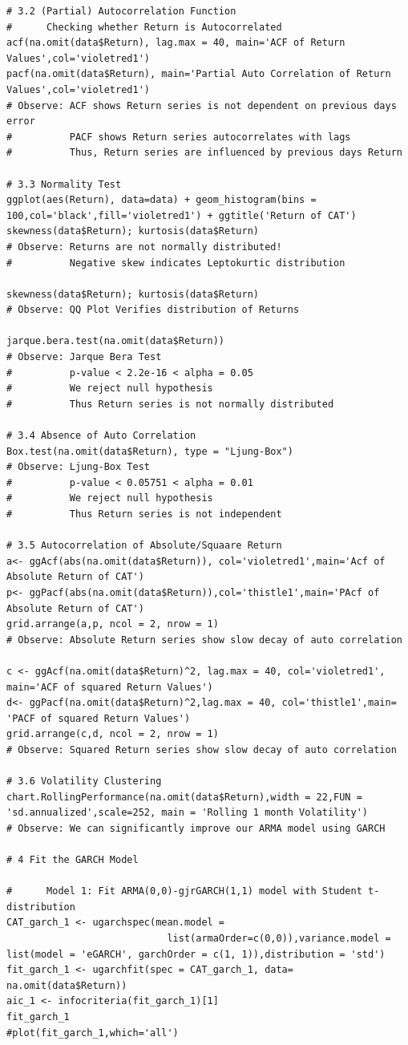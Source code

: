 \documentclass{article}
\begin{document}
\begin{verbatim}
# 3.2 (Partial) Autocorrelation Function
#      Checking whether Return is Autocorrelated
acf(na.omit(data$Return), lag.max = 40, main='ACF of Return Values',col='violetred1')
pacf(na.omit(data$Return), main='Partial Auto Correlation of Return Values',col='violetred1')
# Observe: ACF shows Return series is not dependent on previous days error
#          PACF shows Return series autocorrelates with lags 
#          Thus, Return series are influenced by previous days Return

# 3.3 Normality Test 
ggplot(aes(Return), data=data) + geom_histogram(bins = 100,col='black',fill='violetred1') + ggtitle('Return of CAT')
skewness(data$Return); kurtosis(data$Return)
# Observe: Returns are not normally distributed!
#          Negative skew indicates Leptokurtic distribution

skewness(data$Return); kurtosis(data$Return)
# Observe: QQ Plot Verifies distribution of Returns 

jarque.bera.test(na.omit(data$Return))
# Observe: Jarque Bera Test 
#          p-value < 2.2e-16 < alpha = 0.05
#          We reject null hypothesis 
#          Thus Return series is not normally distributed

# 3.4 Absence of Auto Correlation
Box.test(na.omit(data$Return), type = "Ljung-Box")
# Observe: Ljung-Box Test 
#          p-value < 0.05751 < alpha = 0.01
#          We reject null hypothesis 
#          Thus Return series is not independent

# 3.5 Autocorrelation of Absolute/Squaare Return
a<- ggAcf(abs(na.omit(data$Return)), col='violetred1',main='Acf of Absolute Return of CAT')
p<- ggPacf(abs(na.omit(data$Return)),col='thistle1',main='PAcf of Absolute Return of CAT')
grid.arrange(a,p, ncol = 2, nrow = 1)
# Observe: Absolute Return series show slow decay of auto correlation 

c <- ggAcf(na.omit(data$Return)^2, lag.max = 40, col='violetred1', main='ACF of squared Return Values')
d<- ggPacf(na.omit(data$Return)^2,lag.max = 40, col='thistle1',main= 'PACF of squared Return Values')
grid.arrange(c,d, ncol = 2, nrow = 1)
# Observe: Squared Return series show slow decay of auto correlation 

# 3.6 Volatility Clustering 
chart.RollingPerformance(na.omit(data$Return),width = 22,FUN = 'sd.annualized',scale=252, main = 'Rolling 1 month Volatility')
# Observe: We can significantly improve our ARMA model using GARCH 

# 4 Fit the GARCH Model

#      Model 1: Fit ARMA(0,0)-gjrGARCH(1,1) model with Student t-distribution
CAT_garch_1 <- ugarchspec(mean.model =
                            list(armaOrder=c(0,0)),variance.model = list(model = 'eGARCH', garchOrder = c(1, 1)),distribution = 'std')
fit_garch_1 <- ugarchfit(spec = CAT_garch_1, data= na.omit(data$Return))
aic_1 <- infocriteria(fit_garch_1)[1]
fit_garch_1
#plot(fit_garch_1,which='all')


\end{verbatim}
\end{document}
